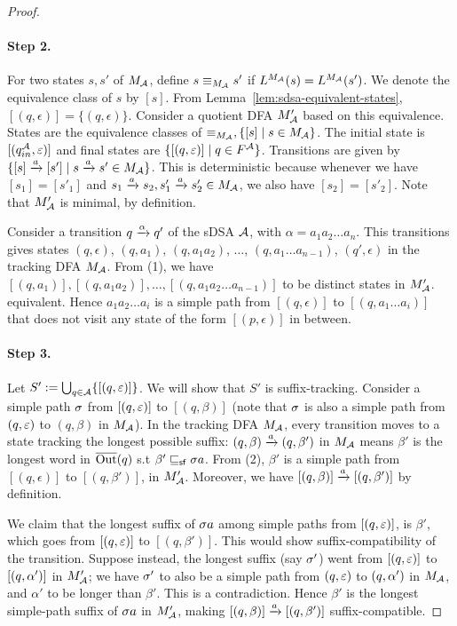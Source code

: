 \begin{proof}
\paragraph*{Step 2.} For two states $s, s'$ of $M_{\mathcal{A}}$, define $s \equiv_{M_{\mathcal{A}}} s'$ if $L^{M_{\mathcal{A}}}(s) = L^{M_{\mathcal{A}}}(s')$. We denote the equivalence class of $s$ by $[s]$. From Lemma~\ref{lem:sdsa-equivalent-states}, $[(q, \epsilon)] = \{ (q, \epsilon)\}$. Consider a quotient DFA $M'_{\mathcal{A}}$ based on this equivalence. States are the equivalence classes of $\equiv_{M_{\mathcal{A}}}, \{ [s] \mid s \in M_{\mathcal{A}} \}$. 
The initial state is $[(q^{\mathcal{A}}_{in}, \varepsilon)]$ and final states are $\{ [(q, \varepsilon)] \mid q \in F^{\mathcal{A}}\}$. Transitions are given by $\{ [s] \xrightarrow{a} [s'] \mid s \xrightarrow{a} s' \in M_{\mathcal{A}} \}$. This is deterministic because whenever we have $[s_1] = [s'_1]$ and $s_1 \xrightarrow{a} s_2, s'_1 \xrightarrow{a} s'_2 \in M_{\mathcal{A}}$, we also have $[s_2]=[s'_2]$. 
Note that $M_{\mathcal{A}}'$ is minimal, by definition. 

Consider a transition $q \xrightarrow{\alpha} q'$ of the sDSA $\mathcal{A}$, with $\alpha = a_1 a_2 \dots a_n$. This transitions gives states $(q, \epsilon)$, $(q, a_1)$, $(q, a_1 a_2)$, $\dots$, $(q, a_1 \dots a_{n-1})$, $(q', \epsilon)$ in the tracking DFA $M_{\mathcal{A}}$. From (1), we have $[(q,a_1)],[(q,a_1a_2)],\dots,[(q,a_1a_2\dots a_{n-1})]$ to be distinct states in $M'_{\mathcal{A}}$. equivalent. Hence $a_1 a_2 \dots a_i$ is a simple path from $[(q, \epsilon)]$ to $[(q, a_1 \dots a_i)]$ that does not visit any state of the form $[(p, \epsilon)]$ in between.

\paragraph*{Step 3.} Let $S' := \bigcup_{q\in\mathcal{A}}\{[(q,\varepsilon)]\}$. We will show that $S'$ is suffix-tracking. Consider a simple path $\sigma$ from $[(q, \varepsilon)]$ to $[(q, \beta)]$ (note that $\sigma$ is also a simple path from $(q, \varepsilon)$ to $(q, \beta)$ in $M_{\mathcal{A}}$). 
In the tracking DFA $M_{\mathcal{A}}$, every transition moves to a state tracking the longest possible suffix: $(q, \beta) \xrightarrow{a} (q, \beta')$ in $M_{\mathcal{A}}$ means $\beta'$ is the longest word in $\overline{\operatorname{Out}}(q)$ s.t $\beta' \sqsubseteq_{\mathsf {sf}} \sigma a$. From (2), $\beta'$ is a simple path from $[(q, \epsilon)]$ to $[(q, \beta')]$, in $M'_{\mathcal{A}}$. Moreover, we have $[(q, \beta)] \xrightarrow{a} [(q, \beta')]$ by definition. 

We claim 
that the longest suffix of $\sigma a$ among simple paths from $[(q,\varepsilon)]$, is $\beta'$, which goes from $[(q,\varepsilon)]$ to $[(q,\beta')]$. This would show suffix-compatibility of the transition. Suppose instead, the longest suffix (say $\sigma'$) went from $[(q,\varepsilon)]$ to $[(q,\alpha')]$ in $M'_{\mathcal{A}}$; we have $\sigma'$ to also be a simple path from $(q, \varepsilon)$ to $(q, \alpha')$ in $M_{\mathcal{A}}$, and $\alpha'$ to be longer than $\beta'$. This is a contradiction. Hence $\beta'$ is the longest simple-path suffix of $\sigma a$ in $M'_{\mathcal{A}}$, making  $[(q, \beta)] \xrightarrow{a} [(q, \beta')]$ suffix-compatible.


\end{proof}
